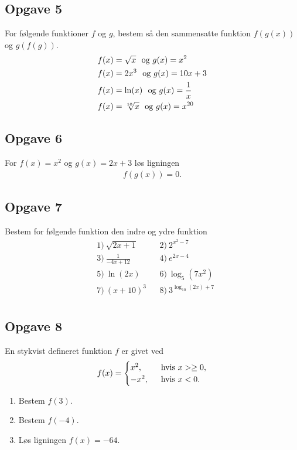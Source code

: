 \subsection*{Opgave 5}
For følgende funktioner $f$ og $g$, bestem så den sammensatte funktion $f(g(x))$ og $g(f(g))$.
\begin{align*}
&f(x) = \sqrt{x}\  \textnormal{ og } g(x) = x^2\\
&f(x) = 2x^3\  \textnormal{ og } g(x) = 10x+3\\
&f(x) = \ln(x)\  \textnormal{ og } g(x) = \frac{1}{x}\\
&f(x) = \sqrt[10]{x}\  \textnormal{ og } g(x) = x^{20}
\end{align*}
\subsection*{Opgave 6}
For $f(x) = x^2$ og $g(x)=2x+3$ løs ligningen
\begin{align*}
f(g(x)) = 0.
\end{align*}

\subsection*{Opgave 7}
Bestem for følgende funktion den indre og ydre funktion
\begin{align*}
	&1) \ \sqrt{2x+1}   &&2) \  2^{x^2-7}     \\
	&3) \ \frac{1}{-4x+12}   &&4) \ e^{2x-4}      \\
	&5) \ \ln(2x)   &&6) \  \log_5(7x^2)     \\
	&7) \ (x+10)^3   &&8) \  3^{\log_{10}(2x)+7}       \\
\end{align*}


\subsection*{Opgave 8}
En stykvist defineret funktion $f$ er givet ved
\begin{align*}
	f(x) = 
	\begin{cases}
		x^2, \ &\textnormal{ hvis } x > \geq 0,\\
		-x^2, \ &\textnormal{ hvis } x < 0.
	\end{cases}
\end{align*}
\begin{enumerate}[label=\roman*)]
	\item Bestem $f(3).$
	\item Bestem $f(-4).$
	\item Løs ligningen $f(x) = -64$.
\end{enumerate}

